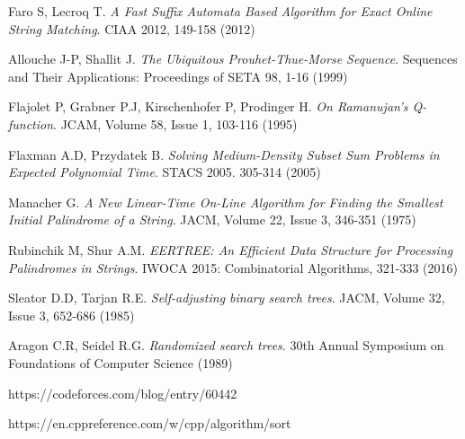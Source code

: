 \begin{thebibliography}{99}
 Faro S, Lecroq T. \textit{A Fast Suffix Automata Based Algorithm for Exact Online String Matching}. CIAA 2012, 149-158 (2012)

 Allouche J-P, Shallit J. \textit{The Ubiquitous Prouhet-Thue-Morse Sequence}. Sequences and Their Applications: Proceedings of SETA 98, 1-16 (1999)

\newpage

 Flajolet P, Grabner P.J, Kirschenhofer P, Prodinger H. \textit{On Ramanujan's Q-function}. JCAM, Volume 58, Issue 1, 103-116 (1995)

 Flaxman A.D, Przydatek B. \textit{Solving Medium-Density Subset Sum Problems
in Expected Polynomial Time}. STACS 2005. 305-314 (2005)

 Manacher G. \textit{A New Linear-Time On-Line Algorithm for Finding the Smallest Initial Palindrome of a String}. JACM, Volume 22, Issue 3, 346-351 (1975)

 Rubinchik M, Shur A.M. \textit{EERTREE: An Efficient Data Structure for Processing Palindromes in Strings}. IWOCA 2015: Combinatorial Algorithms, 321-333 (2016)

 Sleator D.D, Tarjan R.E. \textit{Self-adjusting binary search trees}. JACM, Volume 32, Issue 3, 652-686 (1985)

 Aragon C.R, Seidel R.G. \textit{Randomized search trees}. 30th Annual Symposium on Foundations of Computer Science (1989)

 https://codeforces.com/blog/entry/60442

 https://en.cppreference.com/w/cpp/algorithm/sort

\end{thebibliography}

